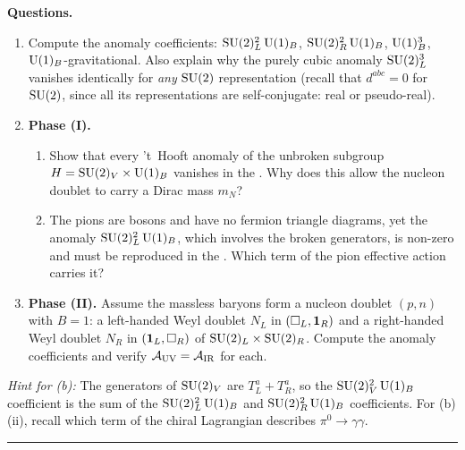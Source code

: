 \documentclass[11pt,a4paper]{article}
\begin{document}
\medskip
\noindent\textbf{Questions.}
\begin{enumerate}[label=(\alph*)]
  \item Compute the \UV{} anomaly coefficients: $\mathrm{SU}(2)_L^2\,\mathrm{U}(1)_B$,
    $\mathrm{SU}(2)_R^2\,\mathrm{U}(1)_B$, $\mathrm{U}(1)_B^3$, $\mathrm{U}(1)_B$-gravitational.
    Also explain why the purely cubic anomaly $\mathrm{SU}(2)_L^3$ vanishes
    identically for \emph{any} $\mathrm{SU}(2)$ representation (recall that
    $d^{abc} = 0$ for $\mathrm{SU}(2)$, since all its representations are
    self-conjugate: real or pseudo-real).
  \item \textbf{Phase (I).}
    \begin{enumerate}[label=(\roman*)]
      \item Show that every 't~Hooft anomaly of the unbroken subgroup
        $H = \mathrm{SU}(2)_V \times \mathrm{U}(1)_B$ vanishes in the \UV{}.  Why does
        this allow the nucleon doublet to carry a Dirac mass $m_N$?
      \item The pions are bosons and have no fermion triangle diagrams,
        yet the \UV{} anomaly $\mathrm{SU}(2)_L^2\,\mathrm{U}(1)_B$, which involves the
        broken generators, is non-zero and must be reproduced in the
        \IR{}.  Which term of the pion effective action carries it?
    \end{enumerate}
  \item \textbf{Phase (II).}  Assume the massless baryons form a nucleon
    doublet $(p, n)$ with $B = 1$: a left-handed Weyl doublet $N_L$ in
    $(\square_L, \mathbf{1}_R)$ and a right-handed Weyl doublet $N_R$ in
    $(\mathbf{1}_L, \square_R)$ of $\mathrm{SU}(2)_L \times \mathrm{SU}(2)_R$.  Compute the
    \IR{} anomaly coefficients and verify
    $\mathcal{A}_{\mathrm{UV}} = \mathcal{A}_{\mathrm{IR}}$ for each.
\end{enumerate}

\noindent\textit{Hint for (b):} The generators of $\mathrm{SU}(2)_V$ are
$T^a_L + T^a_R$, so the $\mathrm{SU}(2)_V^2\,\mathrm{U}(1)_B$ coefficient is the sum of
the $\mathrm{SU}(2)_L^2\,\mathrm{U}(1)_B$ and $\mathrm{SU}(2)_R^2\,\mathrm{U}(1)_B$ coefficients.  For
(b)(ii), recall which term of the chiral Lagrangian describes
$\pi^0 \to \gamma\gamma$.

\bigskip
\hrule
\bigskip
\end{document}
